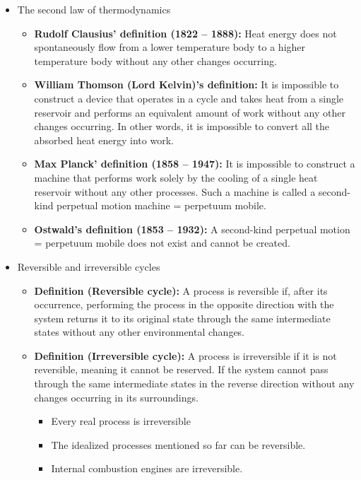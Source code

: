 \documentclass[t,aspectratio=169]{beamer}
\begin{document}
\begin{frame}
\begin{itemize}
\pagebreak
\item The second law of thermodynamics
\begin{itemize}
\item \textbf{Rudolf Clausius’ definition (1822 – 1888):} Heat energy does not spontaneously flow from a lower temperature body to a higher temperature body without any other changes occurring.
\item \textbf{William Thomson (Lord Kelvin)’s definition:} It is impossible to construct a device that operates in a cycle and takes heat from a single reservoir and performs an equivalent amount of work without any other changes occurring. In other words, it is impossible to convert all the absorbed heat energy into work.
\item \textbf{Max Planck’ definition (1858 – 1947):} It is impossible to construct a machine that performs work solely by the cooling of a single heat reservoir without any other processes. Such a machine is called a second-kind perpetual motion machine = perpetuum mobile.
\item \textbf{Ostwald’s definition (1853 – 1932):} A second-kind perpetual motion = perpetuum mobile does not exist and cannot be created.
\end{itemize}

\pagebreak
\item Reversible and irreversible cycles
\begin{itemize}
\item \textbf{Definition (Reversible cycle):} A process is reversible if, after its occurrence, performing the process in the opposite direction with the system returns it to its original state through the same intermediate states without any other environmental changes.
\item \textbf{Definition (Irreversible cycle):} A process is irreversible if it is not reversible, meaning it cannot be reserved. If the system cannot pass through the same intermediate states in the reverse direction without any changes occurring in its surroundings.
\begin{itemize}
\item Every real process is irreversible
\item The idealized processes mentioned so far can be reversible.
\item Internal combustion engines are irreversible.
\end{itemize}
\end{itemize}


\end{itemize}
\end{frame}
\end{document}
